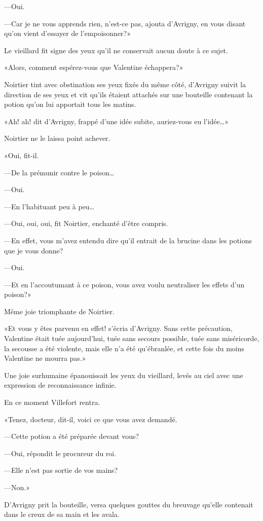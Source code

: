 —Oui. 

—Car je ne vous apprends rien, n'est-ce pas, ajouta d'Avrigny, en vous disant qu'on vient d'essayer de l'empoisonner?» 

Le vieillard fit signe des yeux qu'il ne conservait aucun doute à ce sujet. 

«Alors, comment espérez-vous que Valentine échappera?» 

Noirtier tint avec obstination ses yeux fixés du même côté, d'Avrigny suivit la direction de ses yeux et vit qu'ils étaient attachés sur une bouteille contenant la potion qu'on lui apportait tous les matins. 

«Ah! ah! dit d'Avrigny, frappé d'une idée subite, auriez-vous eu l'idée\dots» 

Noirtier ne le laissa point achever. 

«Oui, fit-il. 

—De la prémunir contre le poison\dots 

—Oui. 

—En l'habituant peu à peu\dots 

—Oui, oui, oui, fit Noirtier, enchanté d'être compris. 

—En effet, vous m'avez entendu dire qu'il entrait de la brucine dans les potions que je vous donne? 

—Oui. 

—Et en l'accoutumant à ce poison, vous avez voulu neutraliser les effets d'un poison?» 

Même joie triomphante de Noirtier. 

«Et vous y êtes parvenu en effet! s'écria d'Avrigny. Sans cette précaution, Valentine était tuée aujourd'hui, tuée sans secours possible, tuée sans miséricorde, la secousse a été violente, mais elle n'a été qu'ébranlée, et cette fois du moins Valentine ne mourra pas.» 

Une joie surhumaine épanouissait les yeux du vieillard, levés au ciel avec une expression de reconnaissance infinie. 

En ce moment Villefort rentra. 

«Tenez, docteur, dit-il, voici ce que vous avez demandé. 

—Cette potion a été préparée devant vous? 

—Oui, répondit le procureur du roi. 

—Elle n'est pas sortie de vos mains? 

—Non.» 

D'Avrigny prit la bouteille, versa quelques gouttes du breuvage qu'elle contenait dans le creux de sa main et les avala. 

